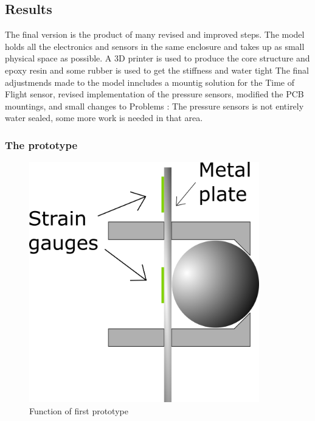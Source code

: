 \subsection{Results}
The final version is the product of many revised and improved steps. The model holds all the electronics and sensors in the same enclosure and takes up as small physical space as possible. A 3D printer is used to produce the core structure and epoxy resin and some rubber is used to get the stiffness and water tight The final adjustmends made to the model inncludes a mountig solution for the 
Time of Flight sensor, revised implementation of the pressure sensors, modified the PCB mountings, and small changes to 
Problems :
The pressure sensors is not entirely water sealed, some more work is needed in that area.  

\subsubsection{The prototype}

\begin{figure}[H]
\begin{center}
	\includegraphics[width = 10cm]{Figures/Press_sens_func_1.png}
	\caption{Function of first prototype}
	\label{Press_sens_prot_1}
\end{center}
\end{figure}
